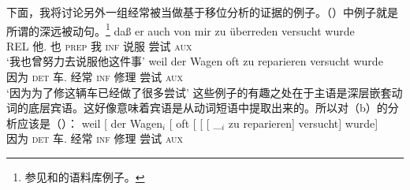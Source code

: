 下面，我将讨论另外一组经常被当做基于移位分析的证据的例子。（）中例子就是所谓的深远被动句\citep[--176]{Hoehle78a}。\footnote{%
参见和的语料库例子。
}
\eal
\ex{}
\gll daß er auch von mir zu überreden versucht wurde\footnotemark\\
     REL 他.\nom{} 也 \textsc{prep} 我 \textsc{inf} 说服 尝试 \textsc{aux}\\
\glt `我也曾努力去说服他这件事'
\ex 
\gll weil    der Wagen oft zu reparieren versucht wurde\\
     因为 \textsc{det} 车.\nom{}   经常 \textsc{inf} 修理   尝试  \textsc{aux}\\
\glt `因为为了修这辆车已经做了很多尝试'\label{bsp-zu-reparieren-versucht-wurde}
\zl
这些例子的有趣之处在于主语是深层嵌套动词的底层宾语。这好像意味着宾语是从动词短语中提取出来的。所以对（b）的分析应该是（）：
\ea
\gll weil    [ der Wagen$_i$ [ oft   [ [ [ \_$_i$ zu reparieren] versucht] wurde]\\
     因为 {}        \textsc{det} 车.\nom{} {}        经常 {}        {}        {}        {}    \textsc{inf} 修理       尝试     \textsc{aux}\\
